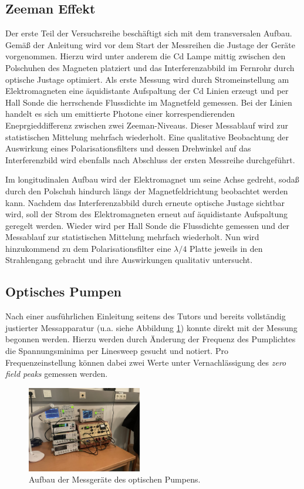 \documentclass[../main.tex]{subfiles}
\begin{document}
    \subsection{Zeeman Effekt}
        Der erste Teil der Versuchsreihe beschäftigt sich mit dem transversalen Aufbau. Gemäß der Anleitung wird vor dem Start der Messreihen die Justage der Geräte vorgenommen. Hierzu wird unter anderem die Cd Lampe mittig zwischen den Polschuhen des Magneten platziert und das Interferenzabbild im Fernrohr durch optische Justage optimiert. Als erste Messung wird durch Stromeinstellung am Elektromagneten eine äquidistante Aufspaltung der Cd Linien erzeugt und per Hall Sonde die herrschende Flussdichte im Magnetfeld gemessen. Bei der Linien handelt es sich um emittierte Photone einer korrespendierenden Eneprgieddifferenz zwischen zwei Zeeman-Niveaus. Dieser Messablauf wird zur statistischen Mittelung mehrfach wiederholt. Eine qualitative Beobachtung der Auswirkung eines Polarisationsfilters und dessen Drehwinkel auf das Interferenzbild wird ebenfalls nach Abschluss der ersten Messreihe durchgeführt.

        Im longitudinalen Aufbau wird der Elektromagnet um seine Achse gedreht, sodaß durch den Polschuh hindurch längs der Magnetfeldrichtung beobachtet werden kann. Nachdem das Interferenzabbild durch erneute optische Justage sichtbar wird, soll der Strom des Elektromagneten erneut auf äquidistante Aufspaltung geregelt werden. Wieder wird per Hall Sonde die Flussdichte gemessen und der Messablauf zur statistischen Mittelung mehrfach wiederholt. Nun wird hinzukommend zu dem Polarisationsfilter eine $\lambda/4$ Platte jeweils in den Strahlengang gebracht und ihre Auswirkungen qualitativ untersucht. 


    \subsection{Optisches Pumpen}
        Nach einer ausführlichen Einleitung seitens des Tutors und bereits vollständig justierter Messapparatur (u.a. siehe Abbildung \ref{fig:OptPumpMessgeraete}) konnte direkt mit der Messung begonnen werden. Hierzu werden durch Änderung der Frequenz des Pumplichtes die Spannungsminima per Linesweep gesucht und notiert. Pro Frequenzeinstellung können dabei zwei Werte unter Vernachlässigung des \emph{zero field peaks} gemessen werden. 
        \begin{figure}[H]
            \centering
            \includegraphics[width=5cm]{Bilddateien/Durchfuehrung/522CFA29-C4DF-4BB6-8FFD-C183A9990129_1_105_c.jpeg}
            \caption{Aufbau der Messgeräte des optischen Pumpens.}
            \label{fig:OptPumpMessgeraete}
        \end{figure}

   
\end{document}
